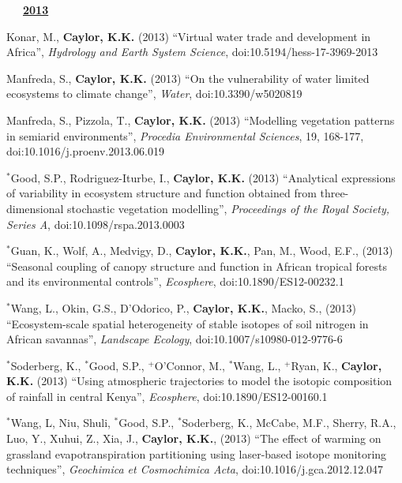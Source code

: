 \documentclass[10pt]{report}
\begin{document}
\begin{etaremune}
\mbox{\ \ \ \underline{\textbf{2013}}}

\item Konar, M., \textbf{Caylor, K.K.} (2013) ``Virtual water trade and development in Africa'', {\em Hydrology and Earth System Science}, doi:10.5194/hess-17-3969-2013

\item Manfreda, S., \textbf{Caylor, K.K.} (2013) ``On the vulnerability of water limited ecosystems to climate change'', {\em Water}, doi:10.3390/w5020819

\item Manfreda, S., Pizzola, T., \textbf{Caylor, K.K.} (2013) ``Modelling vegetation patterns in semiarid environments'', {\em Procedia Environmental Sciences}, 19, 168-177, doi:10.1016/j.proenv.2013.06.019

\item $^{*}$Good, S.P., Rodriguez-Iturbe, I., \textbf{Caylor, K.K.} (2013) ``Analytical expressions of variability in ecosystem structure and function obtained from three-dimensional stochastic vegetation modelling'', {\em Proceedings of the Royal Society, Series A}, doi:10.1098/rspa.2013.0003

\item $^{*}$Guan, K., Wolf, A., Medvigy, D.,  \textbf{Caylor, K.K.}, Pan, M., Wood, E.F.,  (2013) ``Seasonal coupling of canopy structure and function in African tropical forests and its environmental controls'', {\em Ecosphere}, doi:10.1890/ES12-00232.1

\item $^{*}$Wang, L., Okin, G.S., D'Odorico, P., \textbf{Caylor, K.K.}, Macko, S., (2013) ``Ecosystem-scale spatial heterogeneity of stable isotopes of soil nitrogen in African savannas'', {\em Landscape Ecology}, doi:10.1007/s10980-012-9776-6

\item $^{*}$Soderberg, K., $^{*}$Good, S.P., $^{+}$O'Connor, M., $^{*}$Wang, L., $^{+}$Ryan, K., \textbf{Caylor, K.K.} (2013) ``Using atmospheric trajectories to model the isotopic composition of rainfall in central Kenya'', {\em Ecosphere}, doi:10.1890/ES12-00160.1

\item $^{*}$Wang, L, Niu, Shuli, $^{*}$Good, S.P., $^{*}$Soderberg, K., McCabe, M.F., Sherry, R.A., Luo, Y., Xuhui, Z., Xia, J., \textbf{Caylor, K.K.},  (2013) ``The effect of warming on grassland evapotranspiration partitioning using laser-based isotope monitoring techniques'', {\em Geochimica et Cosmochimica Acta}, doi:10.1016/j.gca.2012.12.047


\end{etaremune}
\end{document}
